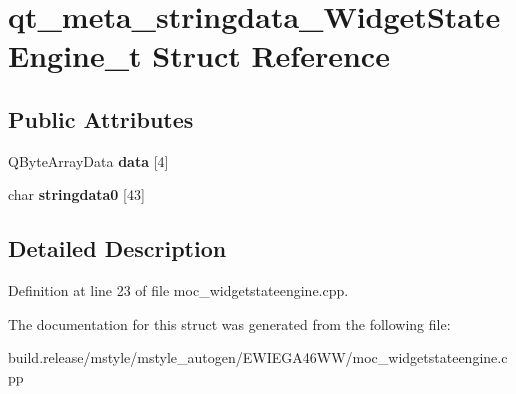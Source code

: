 \hypertarget{structqt__meta__stringdata___widget_state_engine__t}{}\section{qt\+\_\+meta\+\_\+stringdata\+\_\+\+Widget\+State\+Engine\+\_\+t Struct Reference}
\label{structqt__meta__stringdata___widget_state_engine__t}
\subsection*{Public Attributes}
\begin{DoxyCompactItemize}
\item 
\mbox{\label{structqt__meta__stringdata___widget_state_engine__t_aef669f89d2ea924d5e966c451ff8a616}} 
Q\+Byte\+Array\+Data {\bfseries data} \mbox{[}4\mbox{]}
\item 
\mbox{\label{structqt__meta__stringdata___widget_state_engine__t_a1815969e185ae9fccd3c64562831af8d}} 
char {\bfseries stringdata0} \mbox{[}43\mbox{]}
\end{DoxyCompactItemize}


\subsection{Detailed Description}


Definition at line 23 of file moc\+\_\+widgetstateengine.\+cpp.



The documentation for this struct was generated from the following file\+:\begin{DoxyCompactItemize}
\item 
build.\+release/mstyle/mstyle\+\_\+autogen/\+E\+W\+I\+E\+G\+A46\+W\+W/moc\+\_\+widgetstateengine.\+cpp\end{DoxyCompactItemize}
